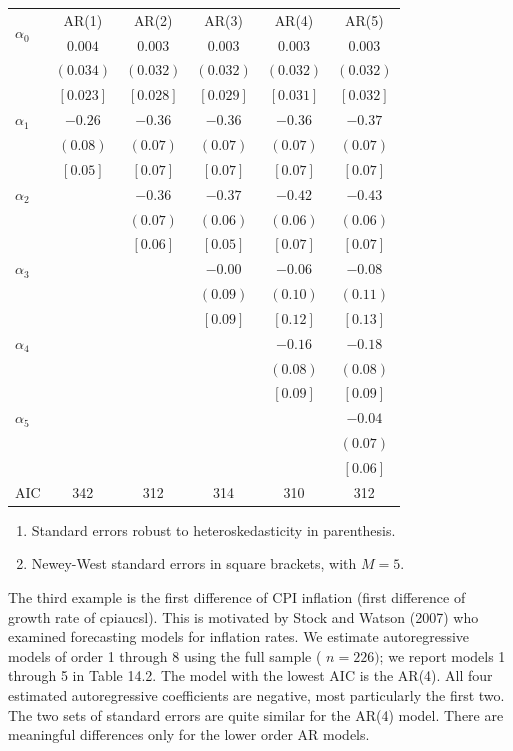 \documentclass[10pt]{article}
\begin{document}
\begin{tabular}{lccccc}
\hline\hline
\multirow{2}{*}{$\alpha_{0}$} & AR(1) & AR(2) & AR(3) & AR(4) & AR(5) \\
\cline { 2 - 7 }
 & $0.004$ & $0.003$ & $0.003$ & $0.003$ & $0.003$ \\
 & $(0.034)$ & $(0.032)$ & $(0.032)$ & $(0.032)$ & $(0.032)$ \\
 & $[0.023]$ & $[0.028]$ & $[0.029]$ & $[0.031]$ & $[0.032]$ \\
$\alpha_{1}$ & $-0.26$ & $-0.36$ & $-0.36$ & $-0.36$ & $-0.37$ \\
 & $(0.08)$ & $(0.07)$ & $(0.07)$ & $(0.07)$ & $(0.07)$ \\
 & $[0.05]$ & $[0.07]$ & $[0.07]$ & $[0.07]$ & $[0.07]$ \\
$\alpha_{2}$ &  & $-0.36$ & $-0.37$ & $-0.42$ & $-0.43$ \\
 &  & $(0.07)$ & $(0.06)$ & $(0.06)$ & $(0.06)$ \\
 &  & $[0.06]$ & $[0.05]$ & $[0.07]$ & $[0.07]$ \\
$\alpha_{3}$ &  &  & $-0.00$ & $-0.06$ & $-0.08$ \\
 &  &  & $(0.09)$ & $(0.10)$ & $(0.11)$ \\
 &  &  & $[0.09]$ & $[0.12]$ & $[0.13]$ \\
$\alpha_{4}$ &  &  &  & $-0.16$ & $-0.18$ \\
 &  &  &  & $(0.08)$ & $(0.08)$ \\
 &  &  &  & $[0.09]$ & $[0.09]$ \\
$\alpha_{5}$ &  &  &  &  & $-0.04$ \\
 &  &  &  &  & $(0.07)$ \\
 &  &  &  &  & $[0.06]$ \\
AIC & 342 & 312 & 314 & 310 & 312 \\
\hline
\end{tabular}

\begin{enumerate}
  \item Standard errors robust to heteroskedasticity in parenthesis.

  \item Newey-West standard errors in square brackets, with $M=5$.

\end{enumerate}
The third example is the first difference of CPI inflation (first difference of growth rate of cpiaucsl). This is motivated by Stock and Watson (2007) who examined forecasting models for inflation rates. We estimate autoregressive models of order 1 through 8 using the full sample ( $n=226)$; we report models 1 through 5 in Table 14.2. The model with the lowest AIC is the AR(4). All four estimated autoregressive coefficients are negative, most particularly the first two. The two sets of standard errors are quite similar for the AR(4) model. There are meaningful differences only for the lower order AR models.
\end{document}

